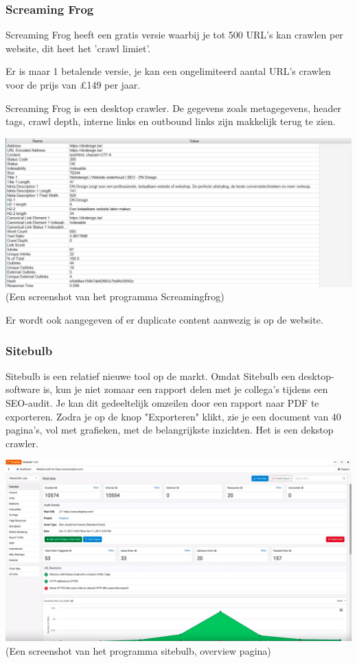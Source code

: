 \subsubsection{Screaming Frog}
\label{ch: Screaming Frog}

Screaming Frog heeft een gratis versie waarbij je tot 500 URL's kan crawlen per website, dit heet het 'crawl limiet'. 

Er is maar 1 betalende versie, je kan een ongelimiteerd aantal URL's crawlen voor de prijs van £149 per jaar. 

Screaming Frog is een desktop crawler. De gegevens zoals metagegevens, header tags, crawl depth, interne links en outbound links zijn makkelijk terug te zien. 

\includegraphics[width=\linewidth]{Bachelorproef/bachelor/img/screamingfrog.PNG}
(Een screenshot van het programma Screamingfrog)

Er wordt ook aangegeven of er duplicate content aanwezig is op de website. 

\subsubsection{Sitebulb}
\label{ch: Sitebulb}

Sitebulb is een relatief nieuwe tool op de markt. Omdat Sitebulb een desktop-software is, kun je niet zomaar een rapport delen met je collega's tijdens een SEO-audit. Je kan dit gedeeltelijk omzeilen door een rapport naar PDF te exporteren. Zodra je op de knop "Exporteren" klikt, zie je een document van 40 pagina's, vol met grafieken, met de belangrijkste inzichten. Het is een dekstop crawler. 

\includegraphics[width=\linewidth]{Bachelorproef/bachelor/img/sitebulb.PNG}
(Een screenshot van het programma sitebulb, overview pagina)

